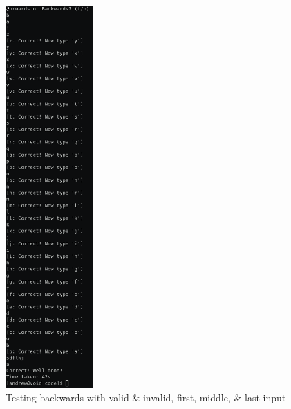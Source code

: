 \documentclass[11pt]{article}
\begin{document}
\begin{center}
\begin{figure}[htp]
    \centering
    \includegraphics[width=0.3\textwidth]{backwards.png}
    \caption{Testing backwards with valid \& invalid, first, middle, \& last input}
\end{figure}
\end{center}
\end{document}
